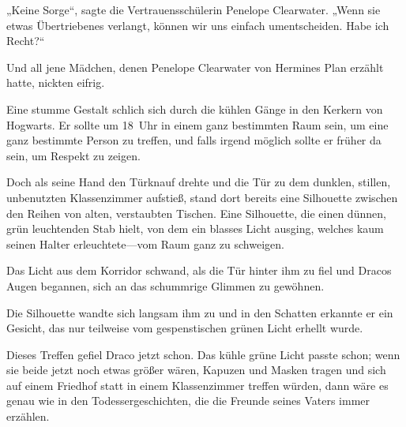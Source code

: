 „Keine Sorge“, sagte die Vertrauensschülerin Penelope Clearwater. „Wenn sie etwas Übertriebenes verlangt, können wir uns einfach umentscheiden. Habe ich Recht?“

Und all jene Mädchen, denen Penelope Clearwater von Hermines Plan erzählt hatte, nickten eifrig.

\later

Eine stumme Gestalt schlich sich durch die kühlen Gänge in den Kerkern von Hogwarts. Er sollte um 18~Uhr in einem ganz bestimmten Raum sein, um eine ganz bestimmte Person zu treffen, und falls irgend möglich sollte er früher da sein, um Respekt zu zeigen.

Doch als seine Hand den Türknauf drehte und die Tür zu dem dunklen, stillen, unbenutzten Klassenzimmer aufstieß, stand dort bereits eine Silhouette zwischen den Reihen von alten, verstaubten Tischen. Eine Silhouette, die einen dünnen, grün leuchtenden Stab hielt, von dem ein blasses Licht ausging, welches kaum seinen Halter erleuchtete—vom Raum ganz zu schweigen.

Das Licht aus dem Korridor schwand, als die Tür hinter ihm zu fiel und Dracos Augen begannen, sich an das schummrige Glimmen zu gewöhnen.

Die Silhouette wandte sich langsam ihm zu und in den Schatten erkannte er ein Gesicht, das nur teilweise vom gespenstischen grünen Licht erhellt wurde.

Dieses Treffen gefiel Draco jetzt schon. Das kühle grüne Licht passte schon; wenn sie beide jetzt noch etwas größer wären, Kapuzen und Masken tragen und sich auf einem Friedhof statt in einem Klassenzimmer treffen würden, dann wäre es genau wie in den Todessergeschichten, die die Freunde seines Vaters immer erzählen.

